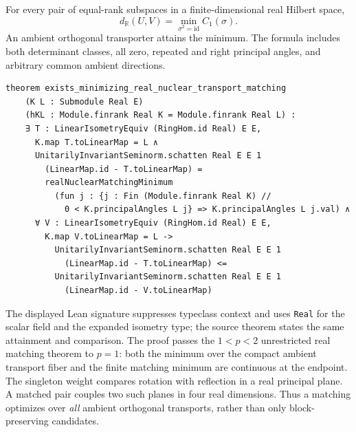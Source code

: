 \begin{theorem}
\label{thm:nuclear-real-matching}
For every pair of equal-rank subspaces in a finite-dimensional real
Hilbert space,
\begin{equation}
 \boxed{d_{\mathbb R}(U,V)=\min_{\sigma^2=\mathrm{id}}C_1(\sigma).}
 \label{eq:nuclear-real-minimum}
\end{equation}
An ambient orthogonal transporter attains the minimum. The formula
includes both determinant classes, all zero, repeated and right
principal angles, and arbitrary common ambient directions.
\end{theorem}

\begin{lstlisting}[style=leanpaper,
 caption={The checked real nuclear attainment theorem. The omitted context
 supplies the finite-dimensional real inner-product structure. The
 \texttt{realNuclearMatchingMinimum} takes the original strictly positive
 labelled angles.},
 label={lst:nuclear-real-matching}]
theorem exists_minimizing_real_nuclear_transport_matching
    (K L : Submodule Real E)
    (hKL : Module.finrank Real K = Module.finrank Real L) :
    ∃ T : LinearIsometryEquiv (RingHom.id Real) E E,
      K.map T.toLinearMap = L ∧
      UnitarilyInvariantSeminorm.schatten Real E E 1
        (LinearMap.id - T.toLinearMap) =
        realNuclearMatchingMinimum
          (fun j : {j : Fin (Module.finrank Real K) //
            0 < K.principalAngles L j} => K.principalAngles L j.val) ∧
      ∀ V : LinearIsometryEquiv (RingHom.id Real) E E,
        K.map V.toLinearMap = L ->
          UnitarilyInvariantSeminorm.schatten Real E E 1
            (LinearMap.id - T.toLinearMap) <=
          UnitarilyInvariantSeminorm.schatten Real E E 1
            (LinearMap.id - V.toLinearMap)
\end{lstlisting}

\noindent The displayed Lean signature suppresses typeclass context and
uses \texttt{Real} for the scalar field and the expanded isometry type;
the source theorem states the same attainment and comparison.
The proof passes the $1<p<2$ unrestricted real matching theorem to
$p=1$: both the minimum over the compact ambient transport fiber and
the finite matching minimum are continuous at the endpoint.
The singleton weight compares rotation with reflection in a real
principal plane. A matched pair couples two such planes in four real
dimensions. Thus a matching optimizes over \emph{all} ambient orthogonal
transports, rather than only block-preserving candidates.

